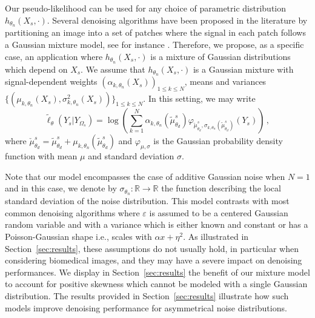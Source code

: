 \documentclass[lettersize,journal]{IEEEtran}
\begin{document}
Our pseudo-likelihood can be used for any choice of parametric distribution $h_{\theta_n}(X_s,\cdot)$. Several denoising algorithms have been proposed in the literature by partitioning an image into a set of patches where the signal in each patch follows a Gaussian mixture model, see for instance   \cite{cao2008image,deledalle2018image}. Therefore, we propose, as a specific case, an application where $h_{\theta_n}(X_s,\cdot)$ is a mixture of Gaussian distributions which depend on $X_s$.  We assume that $h_{\theta_n}(X_s,\cdot)$ is a Gaussian mixture with signal-dependent weights $(\alpha_{k,\theta_n}(X_s))_{1\leqslant k\leqslant N}$, means and variances $\{(\mu_{k,\theta_n}(X_s),\sigma_{k,\theta_n}^2(X_s))\}_{1\leqslant k\leqslant N}$. In this setting, we may write
$$
\widetilde \ell_{\theta}(Y_s|Y_{\Omega_{s}}) = \log\left(\sum_{k=1}^N\alpha_{k,\theta_n}(\tilde\mu^s_{\theta_d})\varphi_{\check \mu^s_{\theta_d},\sigma_{k,\theta_n}(\tilde\mu^s_{\theta_d})}(Y_s)\right)\,,
$$
where $\check \mu^s_{\theta_d} = \tilde\mu^s_{\theta_d} +  \mu_{k,\theta_n}(\tilde\mu^s_{\theta_d})$ and $\varphi_{\mu,\sigma}$ is the Gaussian probability density function with mean $\mu$ and standard deviation $\sigma$.

  Note that our model encompasses the case of additive Gaussian noise when $N=1$ and in this case, we denote by $\sigma_{\theta_n}: \mathbb{R} \to \mathbb{R}$ the function describing the local standard deviation of the noise distribution.
  This model contrasts with most common denoising algorithms where $\varepsilon$ is assumed to be a centered Gaussian random variable and with a variance which is either known and constant or has a Poisson-Gaussian shape i.e., scales with $\alpha x + \eta^2$.
As illustrated in Section~\ref{sec:results}, these assumptions do not usually hold, in particular when considering biomedical images, and they may have a severe impact on denoising performances.
We display in Section~\ref{sec:results} the benefit of our mixture model  to account for positive skewness which cannot be modeled with a single Gaussian distribution.
The results provided in Section~\ref{sec:results} illustrate how such models improve denoising performance for asymmetrical noise distributions.
\end{document}
